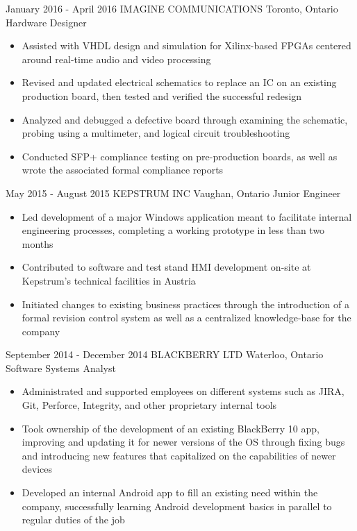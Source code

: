 \documentclass[hidelinks]{kkurucz-cv}
\begin{document}
\begin{entrylist}
\entry
{January 2016 - April 2016}
{IMAGINE COMMUNICATIONS}
{Toronto, Ontario}
{Hardware Designer}
{
\begin{itemize}
	\item Assisted with VHDL design and simulation for Xilinx-based FPGAs centered around real-time audio and video processing
	\item Revised and updated electrical schematics to replace an IC on an existing production board, then tested and verified the successful redesign
	\item Analyzed and debugged a defective board through examining the schematic, probing using a multimeter, and logical circuit troubleshooting
	\item Conducted SFP+ compliance testing on pre-production boards, as well as wrote the associated formal compliance reports
\end{itemize}
}

\entry
{May 2015 - August 2015}
{KEPSTRUM INC}
{Vaughan, Ontario}
{Junior Engineer}
{
\begin{itemize}
	\item Led development of a major Windows application meant to facilitate internal engineering processes, completing a working prototype in less than two months
	\item Contributed to software and test stand HMI development on-site at Kepstrum’s technical facilities in Austria
	\item Initiated changes to existing business practices through the introduction of a formal revision control system as well as a centralized knowledge-base for the company
\end{itemize}
}

\entry
{September 2014 - December 2014}
{BLACKBERRY LTD}
{Waterloo, Ontario}
{Software Systems Analyst}
{
\begin{itemize}
	\item Administrated and supported employees on different systems such as JIRA, Git, Perforce, Integrity, and other proprietary internal tools
	\item Took ownership of the development of an existing BlackBerry 10 app, improving and updating it for newer versions of the OS through fixing bugs and introducing new features that capitalized on the capabilities of newer devices 
	\item Developed an internal Android app to fill an existing need within the company, successfully learning Android development basics in parallel to regular duties of the job
\end{itemize}
}


\end{entrylist}
\end{document}
